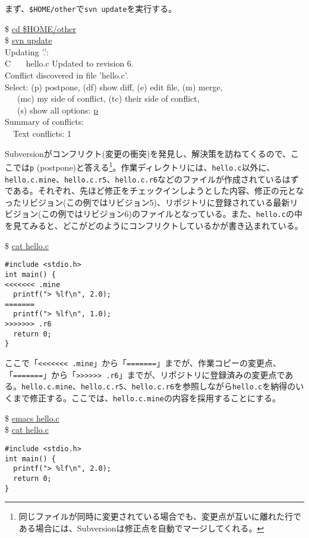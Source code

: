 \documentclass[a4j]{jsbook}
\newcommand{\prompt}{\$ }
\newenvironment{commandline2}{%
  \begin{tcolorbox}\tt%
}{%
  \end{tcolorbox}%
}
\begin{document}
まず、{\tt \$HOME/other}で{\tt svn update}を実行する。
\begin{commandline2}
\prompt \underline{cd \$HOME/other} \\
\prompt \underline{svn update} \\
Updating '.': \\
C \ \ \ hello.c
Updated to revision 6. \\
Conflict discovered in file 'hello.c'. \\
Select: (p) postpone, (df) show diff, (e) edit file, (m) merge, \\
\ \ \   (mc) my side of conflict, (tc) their side of conflict, \\
\ \ \   (s) show all options: \underline{p} \\
Summary of conflicts: \\
\ \ Text conflicts: 1
\end{commandline2} \noindent
Subversionがコンフリクト(変更の衝突)を発見し、解決策を訪ねてくるので、ここでは{\tt p} (postpone)と答える\footnote{同じファイルが同時に変更されている場合でも、変更点が互いに離れた行である場合には、Subversionは修正点を自動でマージしてくれる。}。作業ディレクトリには、{\tt hello.c}以外に、{\tt hello.c.mine}、{\tt hello.c.r5}、{\tt hello.c.r6}などのファイルが作成されているはずである。それぞれ、先ほど修正をチェックインしようとした内容、修正の元となったリビジョン(この例ではリビジョン5)、リポジトリに登録されている最新リビジョン(この例ではリビジョン6)のファイルとなっている。また、{\tt hello.c}の中を見てみると、どこがどのようにコンフリクトしているかが書き込まれている。
\begin{commandline2}
\prompt \underline{cat hello.c}
\vspace*{-.7em} 
\begin{verbatim}
#include <stdio.h>
int main() {
<<<<<<< .mine
  printf("> %lf\n", 2.0);
=======
  printf("> %lf\n", 1.0);
>>>>>>> .r6
  return 0;
}
\end{verbatim}
\end{commandline2} \noindent
ここで「\verb+<<<<<<< .mine+」から「\verb+=======+」までが、作業コピーの変更点、「\verb+=======+」から「\verb+>>>>>> .r6+」までが、リポジトリに登録済みの変更点である。{\tt hello.c.mine}、{\tt hello.c.r5}、{\tt hello.c.r6}を参照しながら{\tt hello.c}を納得のいくまで修正する。ここでは、{\tt hello.c.mine}の内容を採用することにする。
\begin{commandline2}
\prompt \underline{emacs hello.c} \\
\prompt \underline{cat hello.c}
\vspace*{-.7em} 
\begin{verbatim}
#include <stdio.h>
int main() {
  printf("> %lf\n", 2.0);
  return 0;
}
\end{verbatim}
\end{commandline2} \noindent
\end{document}
